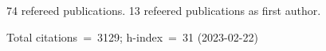 74 refereed publications. 13 refeered publications as first author.

Total citations~=~3129; h-index~=~31 (2023-02-22)